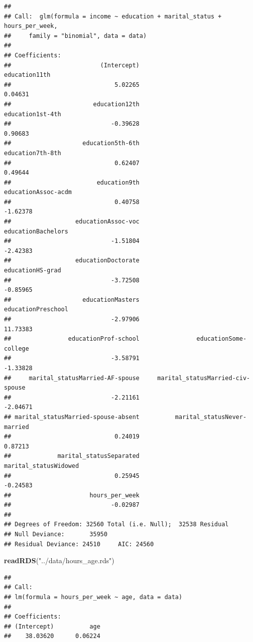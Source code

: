 \documentclass[]{article}
\newenvironment{Shaded}{\begin{snugshade}}{\end{snugshade}}
\newcommand{\KeywordTok}[1]{\textcolor[rgb]{0.13,0.29,0.53}{\textbf{#1}}}
\newcommand{\NormalTok}[1]{#1}
\newcommand{\StringTok}[1]{\textcolor[rgb]{0.31,0.60,0.02}{#1}}
\begin{document}
\begin{verbatim}
## 
## Call:  glm(formula = income ~ education + marital_status + hours_per_week, 
##     family = "binomial", data = data)
## 
## Coefficients:
##                         (Intercept)                        education11th  
##                             5.02265                              0.04631  
##                       education12th                     education1st-4th  
##                            -0.39628                              0.90683  
##                    education5th-6th                     education7th-8th  
##                             0.62407                              0.49644  
##                        education9th                  educationAssoc-acdm  
##                             0.40758                             -1.62378  
##                  educationAssoc-voc                   educationBachelors  
##                            -1.51804                             -2.42383  
##                  educationDoctorate                     educationHS-grad  
##                            -3.72508                             -0.85965  
##                    educationMasters                   educationPreschool  
##                            -2.97906                             11.73383  
##                educationProf-school                educationSome-college  
##                            -3.58791                             -1.33828  
##     marital_statusMarried-AF-spouse     marital_statusMarried-civ-spouse  
##                            -2.21161                             -2.04671  
## marital_statusMarried-spouse-absent          marital_statusNever-married  
##                             0.24019                              0.87213  
##             marital_statusSeparated                marital_statusWidowed  
##                             0.25945                             -0.24583  
##                      hours_per_week  
##                            -0.02987  
## 
## Degrees of Freedom: 32560 Total (i.e. Null);  32538 Residual
## Null Deviance:       35950 
## Residual Deviance: 24510     AIC: 24560
\end{verbatim}

\begin{Shaded}
\begin{Highlighting}[]
\KeywordTok{readRDS}\NormalTok{(}\StringTok{"../data/hours\_age.rds"}\NormalTok{)}
\end{Highlighting}
\end{Shaded}

\begin{verbatim}
## 
## Call:
## lm(formula = hours_per_week ~ age, data = data)
## 
## Coefficients:
## (Intercept)          age  
##    38.03620      0.06224
\end{verbatim}
\end{document}
